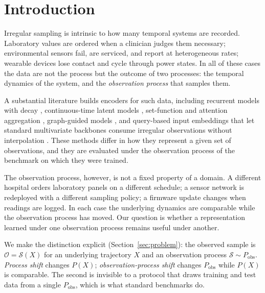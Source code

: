 \documentclass[sigconf,nonacm]{acmart}
\newcommand{\Sobs}{\mathcal{S}}
\newcommand{\Oobs}{\mathcal{O}}
\begin{document}
\maketitle

\section{Introduction}
Irregular sampling is intrinsic to how many temporal systems are recorded. Laboratory values are ordered when a
clinician judges them necessary; environmental sensors fail, are serviced, and report at heterogeneous rates;
wearable devices lose contact and cycle through power states. In all of these cases the data are not the process
but the outcome of two processes: the temporal dynamics of the system, and the \emph{observation process} that
samples them.

A substantial literature builds encoders for such data, including recurrent models with decay
\cite{che2018grud}, continuous-time latent models \cite{rubanova2019latentode,debrouwer2019gruodebayes,kidger2020ncde},
set-function and attention aggregation \cite{horn2020seft,shukla2021mtand}, graph-guided models
\cite{zhang2022raindrop,zhang2024tpatchgnn}, and query-based input embeddings that let standard multivariate
backbones consume irregular observations without interpolation \cite{lim2026quite}. These methods differ in how
they represent a given set of observations, and they are evaluated under the observation process of the
benchmark on which they were trained.

The observation process, however, is not a fixed property of a domain. A different hospital orders laboratory
panels on a different schedule; a sensor network is redeployed with a different sampling policy; a firmware
update changes when readings are logged. In each case the underlying dynamics are comparable while the
observation process has moved. Our question is whether a representation learned under one observation process
remains useful under another.

We make the distinction explicit (Section~\ref{sec:problem}): the observed sample is $\Oobs=\Sobs(X)$ for an
underlying trajectory $X$ and an observation process $\Sobs \sim P_{\mathrm{obs}}$. \emph{Process shift} changes
$P(X)$; \emph{observation-process shift} changes $P_{\mathrm{obs}}$ while $P(X)$ is comparable. The second is
invisible to a protocol that draws training and test data from a single $P_{\mathrm{obs}}$, which is what
standard benchmarks do.
\end{document}
